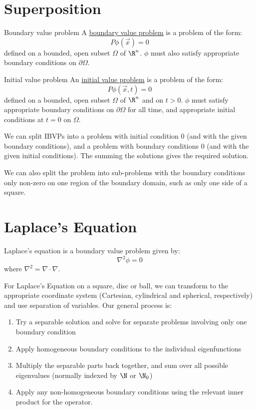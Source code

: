 \documentclass[../Main.tex]{subfiles}
\begin{document}
\section{Superposition}
\begin{definition}{Boundary value problem}
    A \underline{boundary value problem} is a problem of the form:
    \begin{equation*}
        P\phi(\vec{x}) = 0
    \end{equation*}
    defined on a bounded, open subset $\Omega$ of $\R^n$. $\phi$ must also satisfy appropriate boundary conditions on $\partial \Omega$.
\end{definition}
\begin{definition}{Initial value problem}
    An \underline{initial value problem} is a problem of the form:
    \begin{equation*}
        P\phi(\vec{x}, t) = 0
    \end{equation*}
    defined on a bounded, open subset $\Omega$ of $\R^n$ and on $t > 0$. $\phi$ must satisfy appropriate boundary conditions on $\partial \Omega$ for all time, and appropriate initial conditions at $t = 0$ on $\Omega$.
\end{definition}
We can split IBVPs into a problem with initial condition $0$ (and with the given boundary conditions), and a problem with boundary conditions $0$ (and with the given initial conditions). The summing the solutions gives the required solution.

We can also split the problem into sub-problems with the boundary conditions only non-zero on one region of the boundary domain, such as only one side of a square.
\section{Laplace's Equation}
Laplace's equation is a boundary value problem given by:
\begin{equation*}
    \nabla^2 \phi = 0
\end{equation*}
where $\nabla^2 = \nabla \cdot \nabla$.

For Laplace's Equation on a square, disc or ball, we can transform to the appropriate coordinate system (Cartesian, cylindrical and spherical, respectively) and use separation of variables. Our general process is:
\begin{enumerate}
    \item Try a separable solution and solve for separate problems involving only one boundary condition
    \item Apply homogeneous boundary conditions to the individual eigenfunctions
    \item Multiply the separable parts back together, and sum over all possible eigenvalues (normally indexed by $\N$ or $\N_0$)
    \item Apply any non-homogeneous boundary conditions using the relevant inner product for the operator.
\end{enumerate}
\end{document}
